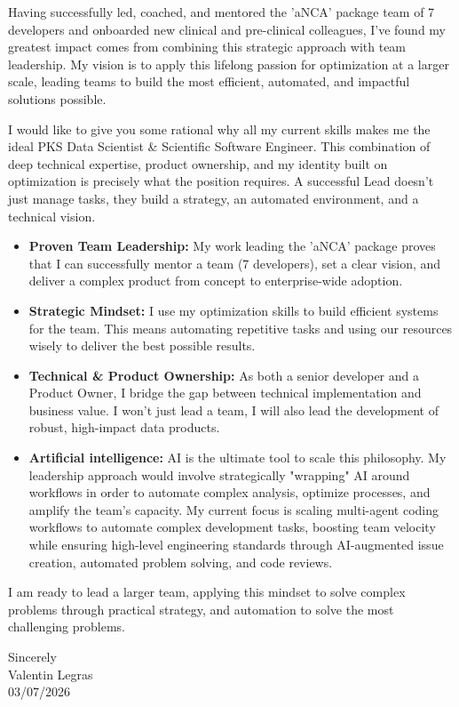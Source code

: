 \documentclass[11pt,a4paper]{article}
\newcommand{\Position}{PKS Data Scientist \& Scientific Software Engineer}
\newcommand{\SignDate}{03/07/2026}
\begin{document}
Having successfully led, coached, and mentored the 'aNCA' package team of 7
developers and onboarded new clinical and pre-clinical colleagues, I've found my
greatest impact comes from combining this strategic approach with team
leadership. My vision is to apply this lifelong passion for optimization at a
larger scale, leading teams to build the most efficient, automated, and impactful
solutions possible.

I would like to give you some rational why all my current skills makes me the
ideal \Position{}. This combination of deep technical expertise, product
ownership, and my identity built on optimization is precisely what the position
requires. A successful Lead doesn't just manage tasks, they build a strategy, an
automated environment, and a technical vision.

\begin{itemize}
  \item \textbf{Proven Team Leadership:} My work leading the 'aNCA' package proves
        that I can successfully mentor a team (7 developers), set a clear vision,
        and deliver a complex product from concept to enterprise-wide adoption.
  \item \textbf{Strategic Mindset:} I use my optimization skills to build
        efficient systems for the team. This means automating repetitive tasks
        and using our resources wisely to deliver the best possible results.
  \item \textbf{Technical \& Product Ownership:} As both a senior developer and a
        Product Owner, I bridge the gap between technical implementation and
        business value. I won't just lead a team, I will also lead the
        development of robust, high-impact data products.
  \item \textbf{Artificial intelligence:} AI is the ultimate tool to scale this
        philosophy. My leadership approach would involve strategically "wrapping"
        AI around workflows in order to automate complex analysis, optimize
        processes, and amplify the team's capacity. My current focus is scaling
        multi-agent coding workflows to automate complex development tasks,
        boosting team velocity while ensuring high-level engineering standards
        through AI-augmented issue creation, automated problem solving, and code
        reviews.
\end{itemize}

I am ready to lead a larger team, applying this mindset to solve complex problems
through practical strategy, and automation to solve the most challenging problems.

\vspace{10pt}
Sincerely\\[6pt]
Valentin Legras\\
\SignDate{}
\end{document}
